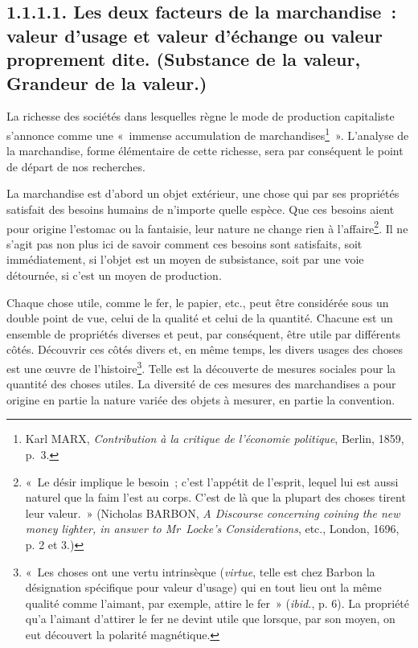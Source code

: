 \documentclass[french,twoside]{book} %
\begin{document}
\subsection[{1.1.1.1. Les deux facteurs de la marchandise : valeur d’usage et valeur d’échange ou valeur proprement dite. (Substance de la valeur, Grandeur de la valeur.)}]{1.1.1.1. Les deux facteurs de la marchandise : valeur d’usage et valeur d’échange ou valeur proprement dite. (Substance de la valeur, Grandeur de la valeur.)}
\noindent La richesse des sociétés dans lesquelles règne le mode de production capitaliste s’annonce comme une « immense accumulation de marchandises\footnote{Karl MARX, \emph{Contribution à la critique de l’économie politique}, Berlin, 1859, p. 3.} ». L’analyse de la marchandise, forme élémentaire de cette richesse, sera par conséquent le point de départ de nos recherches.\par
La marchandise est d’abord un objet extérieur, une chose qui par ses propriétés satisfait des besoins humains de n’importe quelle espèce. Que ces besoins aient pour origine l’estomac ou la fantaisie, leur nature ne change rien à l’affaire\footnote{« Le désir implique le besoin ; c’est l’appétit de l’esprit, lequel lui est aussi naturel que la faim l’est au corps. C’est de là que la plupart des choses tirent leur valeur. » (Nicholas BARBON, \emph{A Discourse concerning coining the new money lighter, in answer to Mr Locke's Considerations}, etc., London, 1696, p. 2 et 3.)}. Il ne s’agit pas non plus ici de savoir comment ces besoins sont satisfaits, soit immédiatement, si l’objet est un moyen de subsistance, soit par une voie détournée, si c’est un moyen de production.\par
Chaque chose utile, comme le fer, le papier, etc., peut être considérée sous un double point de vue, celui de la qualité et celui de la quantité. Chacune est un ensemble de propriétés diverses et peut, par conséquent, être utile par différents côtés. Découvrir ces côtés divers et, en même temps, les divers usages des choses est une œuvre de l’histoire\footnote{« Les choses ont une vertu intrinsèque (\emph{virtue}, telle est chez Barbon la désignation spécifique pour valeur d’usage) qui en tout lieu ont la même qualité comme l’aimant, par exemple, attire le fer » (\emph{ibid.}, p. 6). La propriété qu’a l’aimant d’attirer le fer ne devint utile que lorsque, par son moyen, on eut découvert la polarité magnétique.}. Telle est la découverte de mesures sociales pour la quantité des choses utiles. La diversité de ces mesures des marchandises a pour origine en partie la nature variée des objets à mesurer, en partie la convention.\par
\end{document}
